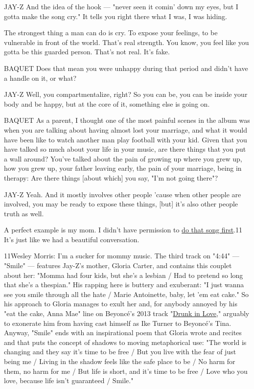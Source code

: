 JAY-Z And the idea of the hook --- "never seen it comin' down my eyes,
but I gotta make the song cry." It tells you right there what I was, I
was hiding.

The strongest thing a man can do is cry. To expose your feelings, to be
vulnerable in front of the world. That's real strength. You know, you
feel like you gotta be this guarded person. That's not real. It's fake.

BAQUET Does that mean you were unhappy during that period and didn't
have a handle on it, or what?

JAY-Z Well, you compartmentalize, right? So you can be, you can be
inside your body and be happy, but at the core of it, something else is
going on.

BAQUET As a parent, I thought one of the most painful scenes in the
album was when you are talking about having almost lost your marriage,
and what it would have been like to watch another man play football with
your kid. Given that you have talked so much about your life in your
music, are there things that you put a wall around? You've talked about
the pain of growing up where you grew up, how you grew up, your father
leaving early, the pain of your marriage, being in therapy: Are there
things {[}about which{]} you say, "I'm not going there"?

JAY-Z Yeah. And it mostly involves other people 'cause when other people
are involved, you may be ready to expose these things, {[}but{]} it's
also other people truth as well.

A perfect example is my mom. I didn't have permission to
\href{https://www.nytimes3xbfgragh.onion/2017/07/02/arts/music/jay-z-4-44-review.html}{do
that song first}.11 It's just like we had a beautiful conversation.

11Wesley Morris: I'm a sucker for mommy music. The third track on "4:44"
--- "Smile" --- features Jay-Z's mother, Gloria Carter, and contains
this couplet about her: "Momma had four kids, but she's a lesbian / Had
to pretend so long that she's a thespian." His rapping here is buttery
and exuberant: "I just wanna see you smile through all the hate / Marie
Antoinette, baby, let 'em eat cake." So his approach to Gloria manages
to exult her and, for anybody annoyed by his "eat the cake, Anna Mae"
line on Beyoncé's 2013 track
"\href{https://open.spotify.com/track/6jG2YzhxptolDzLHTGLt7S}{Drunk in
Love}," arguably to exonerate him from having cast himself as Ike Turner
to Beyoncé's Tina. Anyway, "Smile" ends with an inspirational poem that
Gloria wrote and recites and that puts the concept of shadows to moving
metaphorical use: "The world is changing and they say it's time to be
free / But you live with the fear of just being me / Living in the
shadow feels like the safe place to be / No harm for them, no harm for
me / But life is short, and it's time to be free / Love who you love,
because life isn't guaranteed / Smile."

